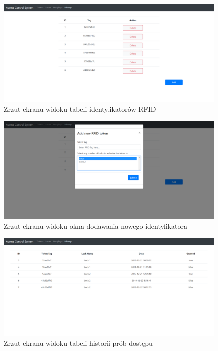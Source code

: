 \begin{itemize}
				\begin{figure}[]
		            \centering
		            \includegraphics[width=\textwidth, frame]{chapters/images/ss1.png}
		            \caption{Zrzut ekranu widoku tabeli identyfikatorów RFID}
		            \label{fig:ss1}
		        \end{figure}

		        \begin{figure}[]
		            \centering
		            \includegraphics[width=\textwidth]{chapters/images/ss2.png}
		            \caption{Zrzut ekranu widoku okna dodawania nowego identyfikatora}
		            \label{fig:ss2}
		        \end{figure}

		        \begin{figure}[]
		            \centering
		            \includegraphics[width=\textwidth, frame]{chapters/images/ss3.png}
		            \caption{Zrzut ekranu widoku tabeli historii prób dostępu}
		            \label{fig:ss3}
		        \end{figure}

    	\end{itemize}

